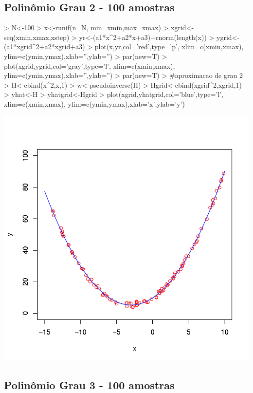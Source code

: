 \documentclass{article}
\begin{document}
\newpage
\subsection{Polinômio Grau 2 - 100 amostras}

\begin{Schunk}
\begin{Sinput}
>   N<-100
>   x<-runif(n=N, min=xmin,max=xmax)
>   xgrid<-seq(xmin,xmax,xstep)
>   yr<-(a1*x^2+a2*x+a3)+rnorm(length(x))
>   ygrid<-(a1*xgrid^2+a2*xgrid+a3)
>   plot(x,yr,col='red',type='p', xlim=c(xmin,xmax), ylim=c(ymin,ymax),xlab='',ylab='')
>   par(new=T)
>   plot(xgrid,ygrid,col='gray',type='l', xlim=c(xmin,xmax), ylim=c(ymin,ymax),xlab='',ylab='')
>   par(new=T)
>   #aproximacao de grau 2
>   H<-cbind(x^2,x,1)
>   w<-pseudoinverse(H) %
>   Hgrid<-cbind(xgrid^2,xgrid,1)
>   yhat<-H%
>   yhatgrid<-Hgrid%
>   plot(xgrid,yhatgrid,col='blue',type='l', xlim=c(xmin,xmax), ylim=c(ymin,ymax),xlab='x',ylab='y')
\end{Sinput}
\end{Schunk}
\includegraphics{aproximacao_polinomial-011}

\newpage
\subsection{Polinômio Grau 3 - 100 amostras}
\end{document}
